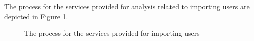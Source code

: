 The process for the services provided for analysis related to importing users are depicted in Figure \ref{fig:userImportProcess}.

\begin{figure}[htb]
\begin{center}
\end{center}
\caption{ The process for the services provided for importing users \label{fig:userImportProcess}}
\end{figure}
